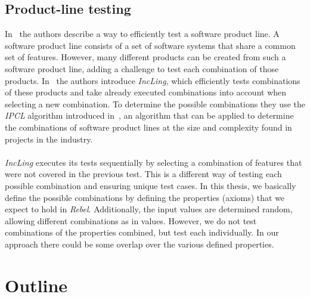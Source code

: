 \subsection{Product-line testing}
In~\cite{al2016incling} the authors describe a way to efficiently test a software product line. A software product line consists of a set of software systems that share a common set of features. However, many different products can be created from such a software product line, adding a challenge to test each combination of those products. In~\cite{al2016incling} the authors introduce \textit{IncLing}, which efficiently tests combinations of these products and take already executed combinations into account when selecting a new combination. To determine the possible combinations they use the \textit{IPCL} algorithm introduced in~\cite{johansen2012algorithm}, an algorithm that can be applied to determine the combinations of software product lines at the size and complexity found in projects in the industry.\\
\\
\textit{IncLing} executes its tests sequentially by selecting a combination of features that were not covered in the previous test. This is a different way of testing each possible combination and ensuring unique test cases. In this thesis, we basically define the possible combinations by defining the properties (axioms) that we expect to hold in \textit{Rebel}. Additionally, the input values are determined random, allowing different combinations as in values. However, we do not test combinations of the properties combined, but test each individually. In our approach there could be some overlap over the various defined properties.

\section{Outline}
